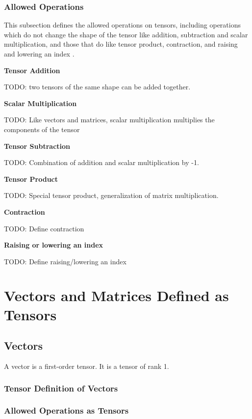 \documentclass[12pt]{article}
\begin{document}
\subsubsection{Allowed Operations}
This subsection defines the allowed operations on tensors, including operations which
do not change the shape of the tensor like addition, subtraction and scalar multiplication,
and those that do like tensor product, contraction, and raising and lowering an index
\citep{Wikipedia_Tensors_2025}.

\medskip
\noindent\textbf{Tensor Addition}

\noindent TODO: two tensors of the same shape can be added together.

\medskip
\noindent\textbf{Scalar Multiplication}

\noindent TODO: Like vectors and matrices, scalar multiplication multiplies the components 
of the tensor

\medskip
\noindent\textbf{Tensor Subtraction}

\noindent TODO: Combination of addition and scalar multiplication by -1.

\medskip
\noindent\textbf{Tensor Product}

\noindent TODO: Special tensor product, generalization of matrix multiplication.

\medskip
\noindent\textbf{Contraction}

\noindent TODO: Define contraction

\medskip
\noindent\textbf{Raising or lowering an index}

\noindent TODO: Define raising/lowering an index


\section{Vectors and Matrices Defined as Tensors}\label{Sec:VecMatAsTensors}

\subsection{Vectors}
A vector is a first-order tensor. It is a tensor of rank 1.

\subsubsection{Tensor Definition of Vectors}

\subsubsection{Allowed Operations as Tensors}
\end{document}
